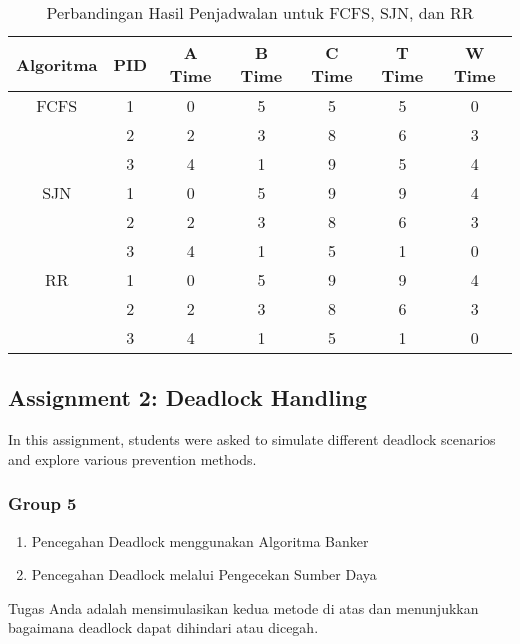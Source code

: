 \documentclass[12pt]{article}
\begin{document}
\begin{table}[htbp]
    \centering
    \begin{tabular}{|c|c|c|c|c|c|c|}
        \hline
        Algoritma & PID & A Time & B Time & C Time & T Time & W Time \\
        \hline
        FCFS      & 1   & 0            & 5          & 5               & 5               & 0            \\
                  & 2   & 2            & 3          & 8               & 6               & 3            \\
                  & 3   & 4            & 1          & 9               & 5               & 4            \\
        \hline
        SJN       & 1   & 0            & 5          & 9               & 9               & 4            \\
                  & 2   & 2            & 3          & 8               & 6               & 3            \\
                  & 3   & 4            & 1          & 5               & 1               & 0            \\
        \hline
        RR        & 1   & 0            & 5          & 9               & 9               & 4            \\
                  & 2   & 2            & 3          & 8               & 6               & 3            \\
                  & 3   & 4            & 1          & 5               & 1               & 0            \\
        \hline
    \end{tabular}
    \caption{Perbandingan Hasil Penjadwalan untuk FCFS, SJN, dan RR}
    \label{tab:hasil_perbandingan}
\end{table}

\subsection{Assignment 2: Deadlock Handling}
In this assignment, students were asked to simulate different deadlock scenarios and explore various prevention methods.

\subsubsection{Group 5}

\begin{enumerate}
    \item Pencegahan Deadlock menggunakan Algoritma Banker
    \item Pencegahan Deadlock melalui Pengecekan Sumber Daya
\end{enumerate}
Tugas Anda adalah mensimulasikan kedua metode di atas dan menunjukkan bagaimana deadlock dapat dihindari atau dicegah.
\end{document}
